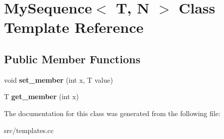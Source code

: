 \hypertarget{classMySequence}{}\section{My\+Sequence$<$ T, N $>$ Class Template Reference}
\label{classMySequence}
\subsection*{Public Member Functions}
\begin{DoxyCompactItemize}
\item 
void {\bfseries set\+\_\+member} (int x, T value)\hypertarget{classMySequence_a11e140540c8a21629c29f91f9574c5d5}{}\label{classMySequence_a11e140540c8a21629c29f91f9574c5d5}

\item 
T {\bfseries get\+\_\+member} (int x)\hypertarget{classMySequence_ae5c91917048f1bc78afd413dc393466e}{}\label{classMySequence_ae5c91917048f1bc78afd413dc393466e}

\end{DoxyCompactItemize}


The documentation for this class was generated from the following file\+:\begin{DoxyCompactItemize}
\item 
src/templates.\+cc\end{DoxyCompactItemize}
